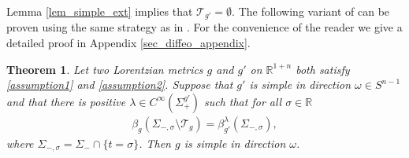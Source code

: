 \documentclass[11pt,letterpaper]{amsart}
\newtheorem{Theorem}{Theorem}[section]
\theoremstyle{definition}
\numberwithin{equation}{section}
\def\R{\mathbb R}
\begin{document}
Lemma \ref{lem_simple_ext} implies that $\mathcal{T}_{g'} = \emptyset$. The following variant of \cite[Theorem 1.6]{oksanen2024} can be proven using the same strategy as in \cite{oksanen2024}. For the convenience of the reader we give a detailed proof in Appendix \ref{sec_diffeo_appendix}.

\begin{Theorem}\label{th_diffeo}
Let two Lorentzian metrics $g$ and $g'$ on $\R^{1+n}$ both satisfy \eqref{assumption1} and \eqref{assumption2}. 
Suppose that $g'$ is simple in direction $\omega \in S^{n-1}$ and that there is positive $\lambda \in C^\infty(\Sigma_+^{g'})$ such that for all $\sigma \in \R$
    \begin{align}\label{eq_beta}
\beta_{g}(\Sigma_{-,\sigma} \setminus \mathcal T_{g})
= 
\beta_{g'}^{\lambda}(\Sigma_{-,\sigma}),
    \end{align}
where $\Sigma_{-,\sigma} = \Sigma_- \cap \{t = \sigma\}$.
Then $g$ is simple in direction $\omega$.
\end{Theorem}
\end{document}
